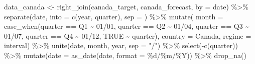 \documentclass[
]{article}
\newenvironment{Shaded}{\begin{snugshade}}{\end{snugshade}}
\newcommand{\AttributeTok}[1]{\textcolor[rgb]{0.77,0.63,0.00}{#1}}
\newcommand{\ConstantTok}[1]{\textcolor[rgb]{0.00,0.00,0.00}{#1}}
\newcommand{\FunctionTok}[1]{\textcolor[rgb]{0.00,0.00,0.00}{#1}}
\newcommand{\NormalTok}[1]{#1}
\newcommand{\OtherTok}[1]{\textcolor[rgb]{0.56,0.35,0.01}{#1}}
\newcommand{\SpecialCharTok}[1]{\textcolor[rgb]{0.00,0.00,0.00}{#1}}
\newcommand{\StringTok}[1]{\textcolor[rgb]{0.31,0.60,0.02}{#1}}
\begin{document}
\begin{Shaded}
\begin{Highlighting}[]
\NormalTok{data\_canada }\OtherTok{\textless{}{-}} \FunctionTok{right\_join}\NormalTok{(canada\_target, canada\_forecast, }\AttributeTok{by =} \StringTok{\textquotesingle{}date\textquotesingle{}}\NormalTok{) }\SpecialCharTok{\%\textgreater{}\%} 
  \FunctionTok{separate}\NormalTok{(date, }\AttributeTok{into =} \FunctionTok{c}\NormalTok{(}\StringTok{\textquotesingle{}year\textquotesingle{}}\NormalTok{, }\StringTok{\textquotesingle{}quarter\textquotesingle{}}\NormalTok{), }\AttributeTok{sep =} \StringTok{\textquotesingle{} \textquotesingle{}}\NormalTok{) }\SpecialCharTok{\%\textgreater{}\%} 
  \FunctionTok{mutate}\NormalTok{(}
    \AttributeTok{month =} \FunctionTok{case\_when}\NormalTok{(quarter }\SpecialCharTok{==} \StringTok{\textquotesingle{}Q1\textquotesingle{}} \SpecialCharTok{\textasciitilde{}} \StringTok{\textquotesingle{}01/01\textquotesingle{}}\NormalTok{,}
\NormalTok{                      quarter }\SpecialCharTok{==} \StringTok{\textquotesingle{}Q2\textquotesingle{}} \SpecialCharTok{\textasciitilde{}} \StringTok{\textquotesingle{}01/04\textquotesingle{}}\NormalTok{,}
\NormalTok{                      quarter }\SpecialCharTok{==} \StringTok{\textquotesingle{}Q3\textquotesingle{}} \SpecialCharTok{\textasciitilde{}} \StringTok{\textquotesingle{}01/07\textquotesingle{}}\NormalTok{,}
\NormalTok{                      quarter }\SpecialCharTok{==} \StringTok{\textquotesingle{}Q4\textquotesingle{}} \SpecialCharTok{\textasciitilde{}} \StringTok{\textquotesingle{}01/12\textquotesingle{}}\NormalTok{,}
                      \ConstantTok{TRUE} \SpecialCharTok{\textasciitilde{}}\NormalTok{ quarter),}
    \AttributeTok{country =} \StringTok{\textquotesingle{}Canada\textquotesingle{}}\NormalTok{,}
    \AttributeTok{regime =} \StringTok{\textquotesingle{}interval\textquotesingle{}}\NormalTok{) }\SpecialCharTok{\%\textgreater{}\%} 
  \FunctionTok{unite}\NormalTok{(date, month, year, }\AttributeTok{sep =} \StringTok{"/"}\NormalTok{) }\SpecialCharTok{\%\textgreater{}\%} 
  \FunctionTok{select}\NormalTok{(}\SpecialCharTok{{-}}\FunctionTok{c}\NormalTok{(quarter)) }\SpecialCharTok{\%\textgreater{}\%} 
  \FunctionTok{mutate}\NormalTok{(}\AttributeTok{date =} \FunctionTok{as\_date}\NormalTok{(date, }\AttributeTok{format =} \StringTok{\textquotesingle{}\%d/\%m/\%Y\textquotesingle{}}\NormalTok{)) }\SpecialCharTok{\%\textgreater{}\%} 
  \FunctionTok{drop\_na}\NormalTok{()}
\end{Highlighting}
\end{Shaded}
\end{document}
